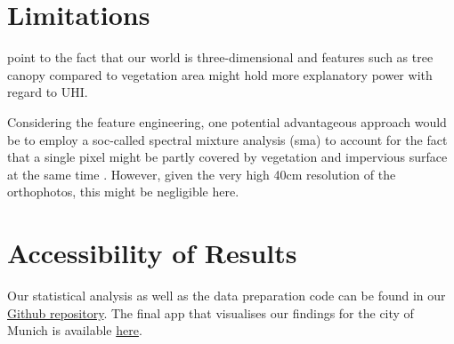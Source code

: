 \documentclass[12pt]{article}
\begin{document}
\section{Limitations}

\citet{deilami2018} point to the fact that our world is three-dimensional and features such as tree canopy compared to vegetation area might hold more explanatory power with regard to UHI.

Considering the feature engineering, one potential advantageous approach would be to employ a soc-called spectral mixture analysis (\acrshort{sma}) to account for the fact that a single pixel might be partly covered by vegetation and impervious surface at the same time \citep{ridd1995}. However, given the very high 40cm resolution of the orthophotos, this might be negligible here.

\section{Accessibility of Results}

Our statistical analysis as well as the data preparation code can be found in our \href{https://github.com/MGenschow/DS_Project}{Github repository}. The final app that visualises our findings for the city of Munich is available \href{https://github.com/MGenschow/DS_Project}{here}.


\newpage
\printglossary[type=\acronymtype, nonumberlist, title={Abbreviations}]

\newpage
{}

\end{document}

